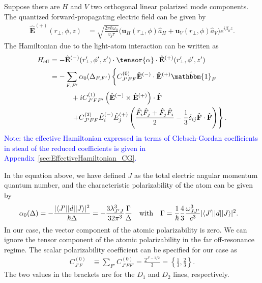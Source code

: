 \documentclass[preprint,aps,pra,onecolumn]{revtex4-1} %
\begin{document}
Suppose there are $H$ and $V$ two orthogonal linear polarized mode components. The quantized forward-propagating electric field can be given by
\begin{align}
\hat{\mathbf{E}}^{(+)}(r\!_\perp,\phi,z) &= \sqrt{ \frac{2 \pi \hbar \omega_0}{ v_g \tau} } \big( \mathbf{u}_H(r\!_\perp,\phi) \hat{a}_H + \mathbf{u}_V(r\!_\perp,\phi) \hat{a}_V \big) e^{i \beta_0 z}.
\end{align}
The Hamiltonian due to the light-atom interaction can be written as
\begin{align}
H_{\rm eff}   &= -\hat{\mathbf{E}}^{(-)}(r^\prime\!\!_\perp,\phi',z')\cdot \tensor{\alpha}\cdot 
\hat{\mathbf{E}}^{(+)}(r^\prime\!\!_\perp,\phi',z') \label{eq:Heff_0}\\
 &=- \sum_{F,F'}\alpha_0(\Delta_{F,F'}) \left\{ C_{J'FF}^{(0)} \hat{\mathbf{E}}^{(-)} \cdot \hat{\mathbf{E}}^{(+)} \hat{\mathbbm{1}}_F \phantom{\frac{\hat{1}}{1}}\right. \nonumber\\
&\quad\quad\quad + i C_{J'FF'}^{(1)} \left(\hat{\mathbf{E}}^{(-)} \times \hat{\mathbf{E}}^{(+)} \right) \cdot \hat{ \mathbf{F}} \nonumber\\
&\quad\quad\quad  \left. + C_{J'FF}^{(2)} \hat{E}_i^{(-)} \hat{E}_j^{(+)} \left( \frac{ \hat{F}_i \hat{F}_j  + \hat{F}_j \hat{F}_i  }{2} - \frac{1}{3}\delta_{ij} \hat{ \mathbf{F}} \cdot \hat{\mathbf{F}}  \right) \right\}. 
\end{align}
\textcolor{blue}{Note: the effective Hamiltonian expressed in terms of Clebsch-Gordan coefficients in 
stead of the reduced coefficients is given in Appendix~\ref{sec:EffectiveHamiltonian_CG}. }

In the equation above, we have defined $ J $ as the total electric angular momentum quantum number, and the characteristic polarizability of the atom can be given by
\begin{align} \label{Eq::alpha0}
\alpha_0(\Delta) & =  -\frac{|  \langle{ J' }\rvert| d | \lvert{ J }\rangle |^2}{\hbar \Delta } = - \frac{3 \lambda_{J' J}^3}{32 \pi^3} \frac{ \Gamma }{ \Delta }\quad \text{with}\quad 
\Gamma = \frac{1}{\hbar} \frac{4}{3} \frac{\omega_{J J'}^3}{c^3} | \langle{ J' }\rvert| d | \lvert{ J }\rangle |^2.
\end{align}
In our case, the vector component of the atomic polarizability is zero. We can ignore the tensor component of the atomic polarizability in the far off-resonance regime. The scalar polarizability coefficient can be specified for our case as
\begin{align} \label{Eq::alpha0}
C_{J' F}^{(0)} &\equiv \sum_{F'} C_{J' F F'}^{(0)} =   \frac{2^{J'-1/2}}{3} =\left\{ \frac{1}{3},\frac{2}{3}\right\}.
\end{align}
The two values in the brackets are for the $D_1$ and $D_2$ lines, respectively.
\end{document}
